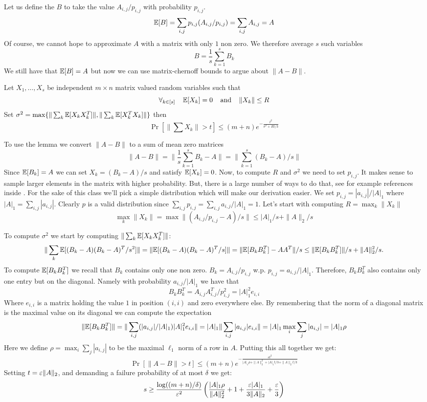 Let us define the $B$ to take the value $A_{i,j}/p_{i,j}$ with probability $p_{i,j}$.
\[
{\mathbb E}[B] = \sum_{i,j} p_{i,j} (A_{i,j}/p_{i,j}) = \sum_{i,j} A_{i,j} = A
\]
Of course, we cannot hope to approximate $A$ with a matrix with only $1$ non zero. We therefore average $s$ such variables
\[
B = \frac{1}{s}\sum_{k=1}^{s}B_{k}
\]
We still have that ${\mathbb E}[B] = A$ but now we can use matrix-chernoff bounds to argue about $\|A - B\|$.
\begin{lemma}
Let $X_1,\ldots, X_s$ be independent $m \times n$ matrix valued random variables such that 
\[
\forall _{k \in [s]} \mbox{\;\;\;\;} {\mathbb E}[X_k] = 0 \mbox{\;\;\;\;and\;\;\;\;} \|X_k\| \le R
\]
Set $\sigma^2 = \max\{\|\sum_k {\mathbb E}[X_k X_k^T]\|, \|\sum_k {\mathbb E}[X_k^T X_k]\|\}$ then
\[
\Pr[\|\sum X_{k}\| > t] \le (m+n)e^{-\frac{t^2}{\sigma^2 + Rt/3}}
\]
\end{lemma}
To use the lemma we convert $\|A - B\|$ to a sum of mean zero matrices
\[
\|A - B\| = \|\frac{1}{s}\sum_{k=1}^{s} B_k - A\| = \|\sum_{k=1}^{s} (B_k - A)/s\|
\]
Since ${\mathbb E}[B_k] = A$ we can set $X_k = (B_k - A)/s$ and satisfy ${\mathbb E}[X_k] = 0$.
Now, to compute $R$ and $\sigma^2$ we need to set $p_{i,j}$. 
It makes sense to sample larger elements in the matrix with higher probability. 
But, there is a large number of ways to do that, see for example references inside  \cite{DrineasZouziasMatrixSampling10}.
For the sake of this class we'll pick a simple distribution which will make our derivation easier. 
We set $p_{i,j} = |a_{i,j}| / |A|_1$ where $|A|_1 = \sum_{i,j}|a_{i,j}|$. Clearly $p$ is a valid distribution since $\sum_{i,j}p_{i,j} =\sum_{i,j}a_{i,j}/|A|_1 =  1$.
%
Let's start with computing $R = \max_k \|X_k\|$
\[
\max_k \|X_k\| = \max \|(A_{i,j}/p_{i,j} - A)/s\| \le |A|_1/s + \|A\|_2/s 
\]

\noindent  To compute $\sigma^2$ we start by computing $\|\sum_k {\mathbb E}[X_k X_k^T]\|$:
\[
\|\sum_k {\mathbb E}[(B_k - A)(B_k -A)^T/s^2]\| = \|{\mathbb E}[(B_k - A)(B_k -A)^T/s]\| = \|{\mathbb E}[B_kB_k^T] - AA^T\|/s \le \|{\mathbb E}[B_kB_k^T]\|/s + \|A\|_2^2/s.
\]
To compute ${\mathbb E}[B_kB_k^T]$ we recall that $B_k$ contains only one non zero. $B_k = A_{i,j}/p_{i,j}$ w.p. $p_{i,j} = a_{i,j}/|A|_1$.
Therefore, $B_kB_k^T$ also contains only one entry but on the diagonal. Namely with probability $a_{i,j}/|A|_1$ we have that
\[
B_k B_k^T = A_{i,j}A_{i,j}^T /p_{i,j}^2 = |A|_1^2 e_{i,i}
\]
Where $e_{i,i}$ is a matrix holding the value $1$ in position $(i,i)$ and zero everywhere else.
By remembering that the norm of a diagonal matrix is the maximal value on its diagonal we can compute the expectation
\[
\|{\mathbb E} [B_k B_k^T]\| =  \|\sum_{i,j} (|a_{i,j}|/|A|_1) |A|_1^2 e_{i,i} \| = |A|_1  \|\sum_{i,j} |a_{i,j}|  e_{i,i} \| = |A|_1  \max_{i} \sum_{j} |a_{i,j}| = |A|_1 \rho
\]
Here we define $\rho = \max_{i} \sum_{j} |a_{i,j}|$ to be the maximal $\ell_1$ norm of a row in $A$. Putting this all together we get:
\[
\Pr[\|A - B\| > t] \le (m+n) e^{-\frac{st^2}{|A|_1 \rho + \|A\|_2^2 + |A|_1 t/3 + \|A\|_2 t /3}}
\]
Setting $t = \varepsilon \|A\|_2$, and demanding a failure probability of at most $\delta$ we get:
\[
s \ge \frac{\log((m+n)/\delta)}{\varepsilon^2}\left(\frac{|A|_1 \rho}{\|A\|_2^2} + 1 + \frac{\varepsilon |A|_1}{3\|A\|_2} + \frac{\varepsilon}{3}\right)
\]

